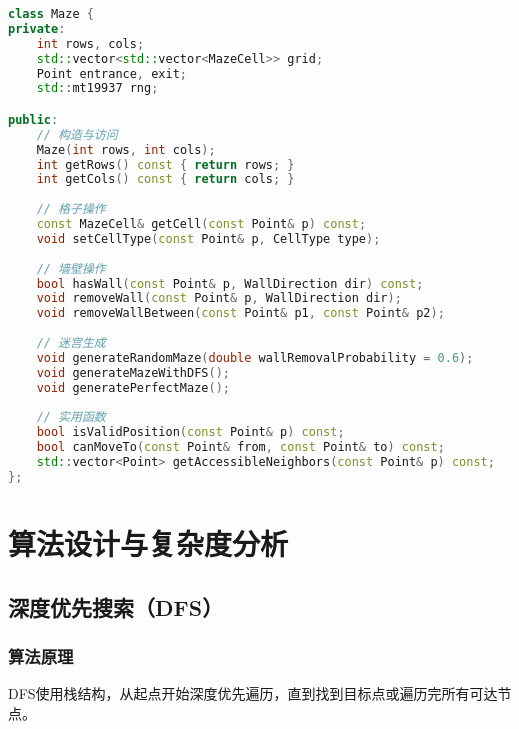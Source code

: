 \documentclass[UTF8]{ctexart}
\begin{document}
\begin{lstlisting}[language=C++]
class Maze {
private:
    int rows, cols;
    std::vector<std::vector<MazeCell>> grid;
    Point entrance, exit;
    std::mt19937 rng;

public:
    // 构造与访问
    Maze(int rows, int cols);
    int getRows() const { return rows; }
    int getCols() const { return cols; }
    
    // 格子操作
    const MazeCell& getCell(const Point& p) const;
    void setCellType(const Point& p, CellType type);
    
    // 墙壁操作
    bool hasWall(const Point& p, WallDirection dir) const;
    void removeWall(const Point& p, WallDirection dir);
    void removeWallBetween(const Point& p1, const Point& p2);
    
    // 迷宫生成
    void generateRandomMaze(double wallRemovalProbability = 0.6);
    void generateMazeWithDFS();
    void generatePerfectMaze();
    
    // 实用函数
    bool isValidPosition(const Point& p) const;
    bool canMoveTo(const Point& from, const Point& to) const;
    std::vector<Point> getAccessibleNeighbors(const Point& p) const;
};
\end{lstlisting}

\section{算法设计与复杂度分析}

\subsection{深度优先搜索（DFS）}

\subsubsection{算法原理}
DFS使用栈结构，从起点开始深度优先遍历，直到找到目标点或遍历完所有可达节点。
\end{document}
